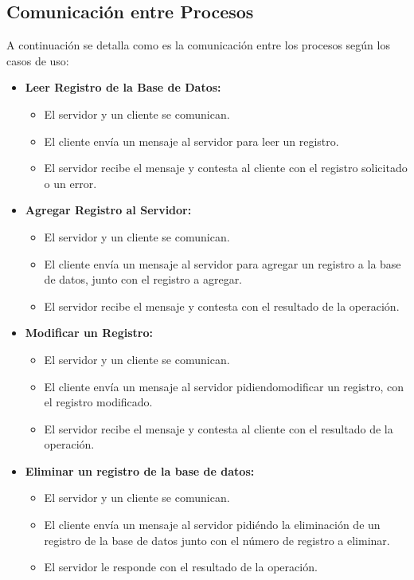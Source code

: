 \documentclass[a4paper,10pt]{article}
\begin{document}
\subsection{Comunicaci\'on entre Procesos} A continuaci\'on se detalla como es la comunicaci\'on entre los procesos seg\'un los casos de uso: \begin{itemize}
				\item \textbf{Leer Registro de la Base de Datos:}	
					\begin{itemize} \item El servidor y un cliente se comunican.
						\item El cliente env\'ia un mensaje al servidor para leer un registro. 
						\item El servidor recibe el mensaje y contesta al cliente con el registro solicitado o un error.
					\end{itemize}
				\item \textbf{Agregar Registro al Servidor:} 
					\begin{itemize}
						\item El servidor y un cliente se comunican.
						\item El cliente env\'ia un mensaje al servidor para agregar un registro a la base de datos, junto con el registro a agregar. 
						\item El servidor recibe el mensaje y contesta con el resultado de la operaci\'on. 
					\end{itemize}
				\item \textbf{Modificar un Registro:}
					\begin{itemize}
						\item El servidor y un cliente se comunican.
						\item El cliente env\'ia un mensaje al servidor pidiendomodificar un registro, con el registro modificado. 
						\item El servidor recibe el mensaje y contesta al cliente con el resultado de la operaci\'on. 
						 \end{itemize} 
\item \textbf{Eliminar un registro de la base de datos:} \begin{itemize}
						\item El servidor y un cliente se comunican.
						\item El cliente env\'ia un mensaje al servidor pidi\'endo la eliminaci\'on de un registro de la base de datos junto con el n\'umero de registro a eliminar.
						\item El servidor le responde con el resultado de la operaci\'on. 
					\end{itemize}
			\end{itemize}
\end{document}

